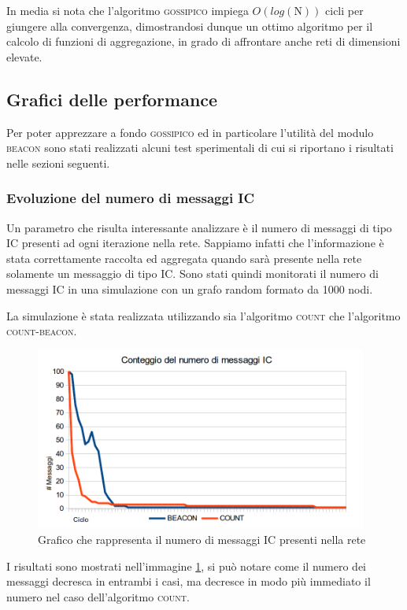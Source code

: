 \documentclass[a4paper,12pt]{article}
\begin{document}
In media si nota che l'algoritmo \textsc{gossipico} impiega $O(log(\mathrm{N}))$ cicli per giungere alla convergenza, dimostrandosi dunque un ottimo algoritmo per il calcolo di funzioni di aggregazione, in grado di affrontare anche reti di dimensioni elevate.

\subsection{Grafici delle performance}
Per poter apprezzare a fondo \textsc{gossipico} ed in particolare l'utilit\`a del modulo \textsc{beacon} sono stati realizzati alcuni test sperimentali di cui si riportano i risultati nelle sezioni seguenti.

\subsubsection{Evoluzione del numero di messaggi IC}

Un parametro che risulta interessante analizzare \`e il numero di messaggi di tipo IC presenti ad ogni iterazione nella rete. Sappiamo infatti che l'informazione \`e stata correttamente raccolta ed aggregata quando sar\`a presente nella rete solamente un messaggio di tipo IC. Sono stati quindi monitorati il numero di messaggi IC in una simulazione con un grafo random formato da 1000 nodi.

La simulazione \`e stata realizzata utilizzando sia l'algoritmo \textsc{count} che l'algoritmo \textsc{count-beacon}.

\begin{figure}[ht]
\centering
\includegraphics[height=6cm]{ic_count.png}
\caption{Grafico che rappresenta il numero di messaggi IC presenti nella rete}
\label{img:graph_count}
\end{figure}

I risultati sono mostrati nell'immagine \ref{img:graph_count}, si pu\`o notare come il numero dei messaggi decresca in entrambi i casi, ma decresce in modo pi\`u immediato il numero nel caso dell'algoritmo \textsc{count}. 
\end{document}
